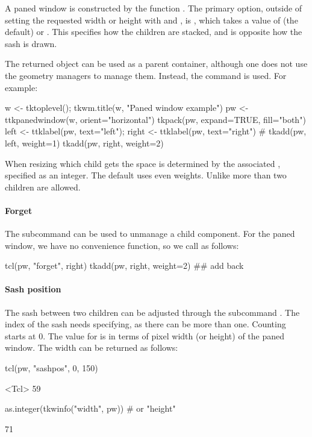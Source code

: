 A paned window  is constructed by the function . The primary option, outside of setting the requested width or height with  and , is , which takes a value of  (the default) or . This specifies how the children are stacked, and is opposite how the sash is drawn.

The returned object can be used as a parent container, although one does not use the geometry managers to manage them. Instead, the  command is used. For example:
\begin{Schunk}
\begin{Sinput}
 w <- tktoplevel(); tkwm.title(w, "Paned window example")
 pw <- ttkpanedwindow(w, orient="horizontal")
 tkpack(pw, expand=TRUE, fill="both")
 left <- ttklabel(pw, text="left"); right <- ttklabel(pw, text="right")
 #
 tkadd(pw, left, weight=1)
 tkadd(pw, right, weight=2)
\end{Sinput}
\end{Schunk}
When resizing which child gets the space is determined by the
associated , specified as an integer. The default uses
even weights.  Unlike \GTK\/ more than two children are allowed.

\paragraph{Forget}
The subcommand  can be used to
unmanage a child component. For the paned window, we have no convenience function, so we call as follows:
\begin{Schunk}
\begin{Sinput}
 tcl(pw, "forget", right)
 tkadd(pw, right, weight=2) ## add back
\end{Sinput}
\end{Schunk}

\paragraph{Sash position}
The sash between two children can be adjusted through the subcommand
. The index of the sash needs
specifying, as there can be more than one. Counting starts at 0. The
value for  is in terms of pixel width (or height) of the
paned window. The width can be returned as follows:
\begin{Schunk}
\begin{Sinput}
 tcl(pw, "sashpos", 0, 150)
\end{Sinput}
\begin{Soutput}
<Tcl> 59 
\end{Soutput}
\begin{Sinput}
 as.integer(tkwinfo("width", pw))  # or "height"
\end{Sinput}
\begin{Soutput}
[1] 71
\end{Soutput}
\end{Schunk}

